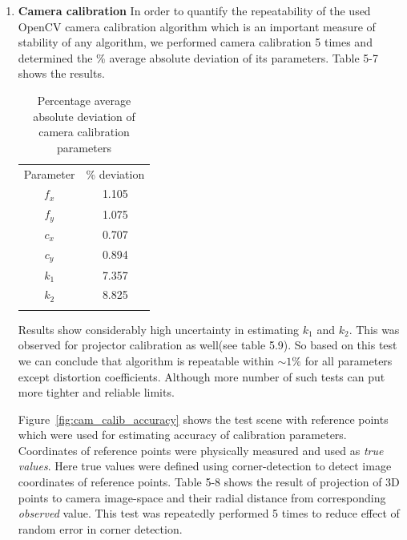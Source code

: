 \begin{enumerate}
\item{\textbf{Camera calibration}\newline}
In order to quantify the repeatability of the used OpenCV camera calibration algorithm which is an important measure of stability of any algorithm, we performed camera calibration 5 times and determined the \% average absolute deviation of its parameters. Table 5-7 shows the results.
\begin{table}[ht]
\centering
\begin{tabular}{c c}
\hline\noalign{\smallskip}
Parameter  & \% deviation \\
\noalign{\smallskip}\hline\noalign{\smallskip}
$f_x$   & 1.105  \\
$f_y$   & 1.075  \\
$c_x$   & 0.707  \\
$c_y$   & 0.894  \\
$k_1$   & 7.357 \\
$k_2$  &  8.825 \\
\noalign{\smallskip}\hline
\end{tabular}
\caption{Percentage average absolute deviation of camera calibration parameters}
\end{table}
\noindent
Results show considerably high uncertainty in estimating $k_1$ and $k_2$. This was observed for projector calibration as well(see table 5.9). So based on this test we can conclude that algorithm is repeatable within $\sim1\%$ for all parameters except distortion coefficients. Although more number of such tests can put more tighter and reliable limits.

Figure~\ref{fig:cam_calib_accuracy} shows the test scene with reference points which were used for estimating accuracy of calibration parameters. Coordinates of reference points were physically measured and used as \textit{true values}. Here true values were defined using corner-detection to detect image coordinates of reference points. Table 5-8 shows the result of projection of 3D points to camera image-space and their radial distance from corresponding \textit{observed} value. This test was repeatedly performed 5 times to reduce effect of random error in corner detection. 



\end{enumerate}
